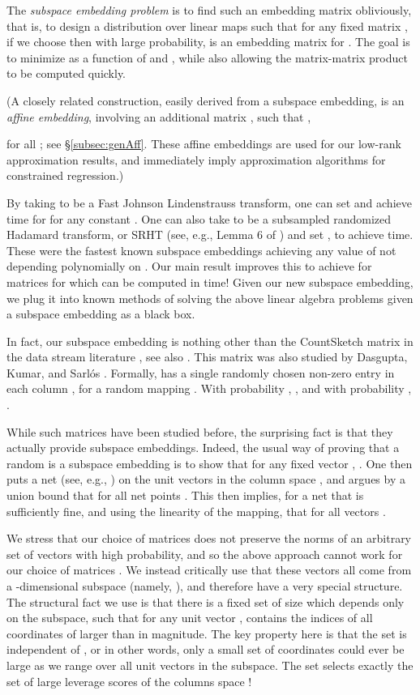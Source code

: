 \documentclass{sig-alternate}
\begin{document}
The \emph{subspace embedding problem} is to find such an embedding matrix obliviously, that is,
 to design a distribution  over linear maps  such that for any
 fixed  matrix , if we choose  then with large probability,
  is an embedding matrix for . The goal is to minimize
 as a function of  and , while also allowing the matrix-matrix product
 to be computed quickly.

(A closely related construction, easily derived from a subspace embedding,
is an \emph{affine embedding}, involving an additional matrix ,
such that
\ifSTOC
,
\else

\fi
for all ;
see \S\ref{subsec:genAff}. These affine embeddings are used for our low-rank
approximation results, and immediately imply approximation algorithms
for constrained regression.)

By taking  to be a Fast Johnson Lindenstrauss transform, one can set  and achieve  time
for  for any constant . One can also take  to be a subsampled randomized Hadamard transform, or SRHT
(see, e.g., Lemma 6 of \cite{BG}) and set ,
to achieve  time.
These were the fastest known subspace embeddings achieving any value of 
not depending polynomially on . Our main result improves this to achieve  for matrices 
for which  can be computed in  time! Given our new subspace embedding, we plug it into known methods of solving
the above linear algebra problems given a subspace embedding as a black box.

In fact, our subspace embedding is nothing other than the {\sf CountSketch} matrix in the data stream literature \cite{ccf04}, see also
\cite{tz04}. This matrix was also studied by Dasgupta, Kumar, and Sarl\'os \cite{dks10}. Formally,  has a single randomly chosen non-zero
entry  in each column , for a random mapping .
With probability , , and with probability , . 


While such matrices  have been studied before, the surprising fact is that they actually provide subspace embeddings.
Indeed, the usual way of proving that a random  is a subspace embedding is to show that for any fixed vector ,
. One then puts a net (see, e.g., \cite{ahk06}) on the unit vectors in the column
space  , and argues by a union bound that  for all net points . This then implies, for a net that
is sufficiently fine, and using the linearity of the mapping, 
that  for all vectors . 

We stress that our choice of matrices  does not preserve the norms of 
an arbitrary
set of  vectors with high probability, and so
the above approach cannot work for our choice of matrices .
We instead critically use that these  vectors all come
from a -dimensional subspace (namely, ), and
therefore have a very special structure.
The structural fact we use is that there is a fixed set  of size  which depends only on the
subspace, such that for any unit vector ,  contains the indices
of all coordinates of  larger than  in magnitude.
The key property here is that the set 
is independent of , or in other words, only a small set of coordinates could ever be large
as we range over all unit vectors in the subspace.
The set  selects exactly the set of large leverage scores of the columns space !
\end{document}
